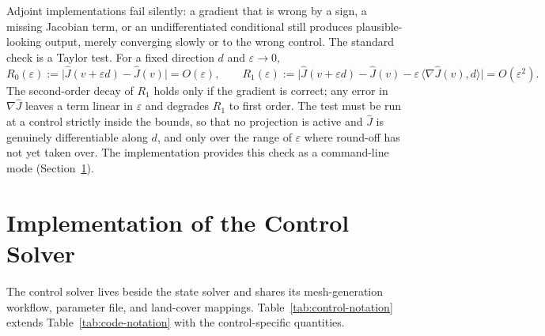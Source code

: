 \documentclass[11pt]{article}
\begin{document}
Adjoint implementations fail silently: a gradient that is wrong by a sign, a missing Jacobian term, or an undifferentiated conditional still produces plausible-looking output, merely converging slowly or to the wrong control. The standard check is a Taylor test. For a fixed direction $d$ and $\varepsilon\to0$,
\begin{equation}
R_0(\varepsilon) := \big|\hat J(v+\varepsilon d) - \hat J(v)\big| = O(\varepsilon),
\qquad
R_1(\varepsilon) := \big|\hat J(v+\varepsilon d) - \hat J(v) - \varepsilon\,\langle \nabla\hat J(v), d\rangle\big| = O(\varepsilon^2).
\end{equation}
The second-order decay of $R_1$ holds only if the gradient is correct; any error in $\nabla\hat J$ leaves a term linear in $\varepsilon$ and degrades $R_1$ to first order. The test must be run at a control strictly inside the bounds, so that no projection is active and $\hat J$ is genuinely differentiable along $d$, and only over the range of $\varepsilon$ where round-off has not yet taken over. The implementation provides this check as a command-line mode (Section~\ref{sec:control-implementation}).

\section{Implementation of the Control Solver}
\label{sec:control-implementation}

The control solver lives beside the state solver and shares its mesh-generation workflow, parameter file, and land-cover mappings. Table~\ref{tab:control-notation} extends Table~\ref{tab:code-notation} with the control-specific quantities.
\end{document}
